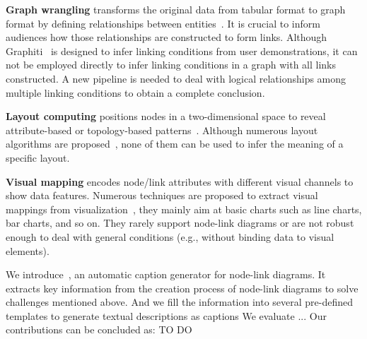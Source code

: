 \begin{compactenum}
\item \textbf{Graph wrangling} transforms the original data from tabular format to graph format by defining relationships between entities~\cite{DBLP:journals/tvcg/SrinivasanPEB18, DBLP:conf/ieeevast/BigelowNML19, DBLP:journals/ivs/HeerP14, DBLP:journals/ivs/LiuNS14}.
It is crucial to inform audiences how those relationships are constructed to form links.
Although Graphiti~\cite{DBLP:journals/tvcg/SrinivasanPEB18} is designed to infer linking conditions from user demonstrations, it can not be employed directly to infer linking conditions in a graph with all links constructed.
A new pipeline is needed to deal with logical relationships among multiple linking conditions to obtain a complete conclusion.

\item \textbf{Layout computing} positions nodes in a two-dimensional space to reveal attribute-based or topology-based patterns~\cite{DBLP:journals/cgf/NobreMSL19}.
Although numerous layout algorithms are proposed~\cite{}, none of them can be used to infer the meaning of a specific layout.

\item \textbf{Visual mapping} encodes node/link attributes with different visual channels to show data features. 
Numerous techniques are proposed to extract visual mappings from visualization~\cite{},  they mainly aim at basic charts such as line charts, bar charts, and so on.
They rarely support node-link diagrams or are not robust enough to deal with general conditions (e.g., without binding data to visual elements).
\end{compactenum}

We introduce~\textit{\ApproachName}, an automatic caption generator for node-link diagrams.
It extracts key information from the creation process of node-link diagrams to solve challenges mentioned above.
And we fill the information into several pre-defined templates to generate textual descriptions as captions
{\color{red} We evaluate ...}
Our contributions can be concluded as:
\colorbox{text-highlight}{TO DO}

